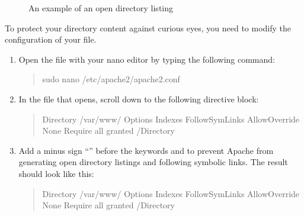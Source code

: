 \documentclass[a4paper,10pt,english,openany,oneside]{sphinxmanual}
\begin{document}
\begin{figure}[H]
\centering
\capstart

\noindent{}
\caption{An example of an open directory listing}\label{\detokenize{hardening-apache:id2}}\end{figure}

\sphinxAtStartPar
To protect your directory content against curious eyes, you need to modify the configuration of your  file.
\begin{enumerate}
%
\item {} 
\sphinxAtStartPar
Open the file with your nano editor by typing the following command:
\begin{quote}

\begin{sphinxVerbatim}[commandchars=\\\{\}]
\PYGZdl{} sudo nano /etc/apache2/apache2.conf
\end{sphinxVerbatim}
\end{quote}

\item {} 
\sphinxAtStartPar
In the file that opens, scroll down to the following directive block:
\begin{quote}

\begin{sphinxVerbatim}[commandchars=\\\{\}]
\PYGZlt{}Directory /var/www/\PYGZgt{}
        Options Indexes FollowSymLinks
        AllowOverride None
        Require all granted
\PYGZlt{}/Directory\PYGZgt{}
\end{sphinxVerbatim}
\end{quote}

\item {} 
\sphinxAtStartPar
Add a minus sign “\sphinxhyphen{}” before the keywords  and  to prevent Apache from generating open directory listings and following symbolic links. The result should look like this:
\begin{quote}

\begin{sphinxVerbatim}[commandchars=\\\{\}]
\PYGZlt{}Directory /var/www/\PYGZgt{}
        Options \PYGZhy{}Indexes \PYGZhy{}FollowSymLinks
        AllowOverride None
        Require all granted
\PYGZlt{}/Directory\PYGZgt{}
\end{sphinxVerbatim}
\end{quote}


\end{enumerate}
\end{document}
